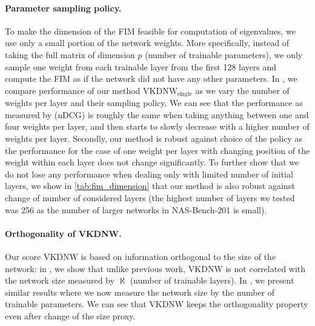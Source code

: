 
\paragraph{Parameter sampling policy.}
To make the dimension of the FIM feasible for computation of eigenvalues, we use only a small portion of the network weights. More specifically, instead of taking the full matrix of dimension $p$ (number of trainable parameters), we only sample one weight from each trainable layer from the first 128 layers and compute the FIM as if the network did not have any other parameters. In , we compare performance of our method $\text{VKDNW}_{\text{single}}$ as we vary the number of weights per layer and their sampling policy. We can see that the performance as measured by (nDCG) is roughly the same when taking anything between one and four weights per layer, and then starts to slowly decrease with a higher number of weights per layer. Secondly, our method is robust against choice of the policy as the performance for the case of one weight per layer with changing position of the weight within each layer does not change significantly. To further show that we do not lose any performance when dealing only with limited number of initial layers, we show in \cref{tab:fim_dimension} that our method is also robust against change of number of considered layers (the highest number of layers we tested was 256 as the number of larger networks in NAS-Bench-201 is small).


\paragraph{Orthogonality of VKDNW.}

Our score VKDNW is based on information orthogonal to the size of the network: in , we show that unlike previous work, VKDNW is not correlated with the network size measured by $\aleph$ (number of trainable layers). In , we present similar results where we now measure the network size by the number of trainable parameters. We can see that VKDNW keeps the orthogonality property even after change of the size proxy.


%
